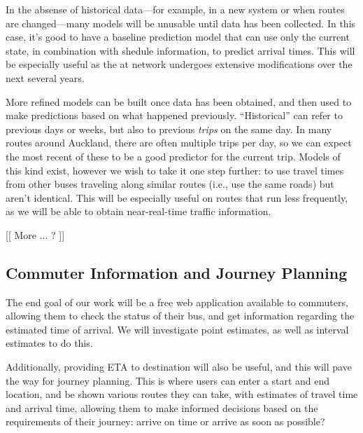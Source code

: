 \documentclass[12pt,a4paper]{article}
\begin{document}
In the absense of historical data---for example, in a new system or when
routes are changed---many models will be unusable until data has been collected.
In this case, it's good to have a baseline prediction model that can use 
only the current state, in combination with shedule information,
to predict arrival times.
This will be especially useful as the \gls{at} network undergoes
extensive modifications over the next several years.


More refined models can be built once data has been obtained, 
and then used to make predictions based on what happened previously.
``Historical'' can refer to previous days or weeks,
but also to previous \emph{trips} on the same day.
In many routes around Auckland, there are often multiple trips per day,
so we can expect the most recent of these to be a good predictor for the current trip.
Models of this kind exist, however we wish to take it one step further:
to use travel times from other buses traveling along similar routes
(i.e., use the same roads) but aren't identical.
This will be especially useful on routes that run less frequently,
as we will be able to obtain near-real-time traffic information.


[[ More ... ? ]]



\subsection{Commuter Information and Journey Planning}
\label{sec:commuter-info}


The end goal of our work will be a free web application available to
commuters, allowing them to check the status of their bus,
and get information regarding the estimated time of arrival.
We will investigate point estimates, as well as interval estimates to do this.


Additionally, providing ETA to destination will also be useful,
and this will pave the way for journey planning.
This is where users can enter a start and end location,
and be shown various routes they can take,
with estimates of travel time and arrival time,
allowing them to make informed decisions based on the requirements of their journey:
arrive on time or arrive as soon as possible?









\end{document}
